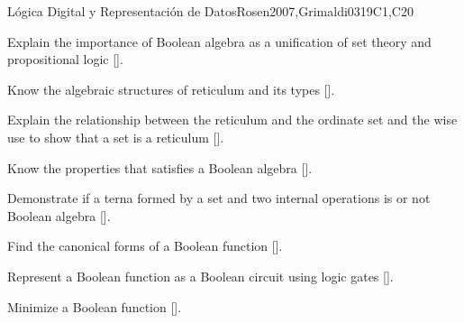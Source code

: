 \begin{syllabus}
\begin{unit}{}{Lógica Digital y Representación de Datos}{Rosen2007,Grimaldi03}{19}{C1,C20}
   \begin{learningoutcomes}
	\item Explain the importance of Boolean algebra as a unification of set theory and propositional logic [\Assessment].
	\item Know the algebraic structures of reticulum and its types [\Assessment].
	\item Explain the relationship between the reticulum and the ordinate set and the wise use to show that a set is a reticulum [\Assessment].
	\item Know the properties that satisfies a Boolean algebra [\Assessment].
	\item Demonstrate if a terna formed by a set and two internal operations is or not Boolean algebra [\Assessment].
	\item Find the canonical forms of a Boolean function  [\Assessment].
	\item Represent a Boolean function as a Boolean circuit using logic gates  [\Assessment].
	\item Minimize a Boolean function [\Assessment].
    \end{learningoutcomes}
 \end{unit}



\begin{coursebibliography}
\end{coursebibliography}

\end{syllabus}

%
